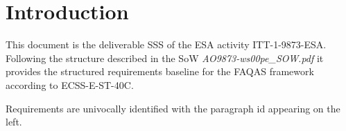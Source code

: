
\section{Introduction}
\label{sec:introduction}

This document is the deliverable SSS of the ESA activity ITT-1-9873-ESA. Following the structure described in the SoW \emph{AO9873-ws00pe\_SOW.pdf} it provides the structured requirements baseline for the FAQAS framework according to ECSS-E-ST-40C.

Requirements are univocally identified with the paragraph id appearing on the left.
 
 
 

